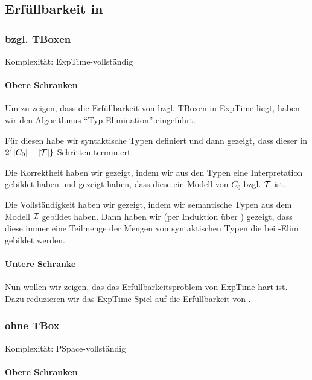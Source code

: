 \subsection{Erfüllbarkeit in \texorpdfstring{\ALC}{ALC}}

\subsubsection{\texorpdfstring{\ALC}{ALC} bzgl. TBoxen}

Komplexität: ExpTime-vollständig

\paragraph{Obere Schranken}

Um zu zeigen, dass die Erfüllbarkeit von \ALC bzgl. TBoxen in ExpTime liegt, haben wir den Algorithmus \enquote{Typ-Elimination} eingeführt.

Für diesen habe wir syntaktische Typen definiert und dann gezeigt, dass dieser in $2^\{|C_0|+|\mathcal{T}|\}$ Schritten terminiert.

Die Korrektheit haben wir gezeigt, indem wir aus den Typen eine Interpretation gebildet haben und gezeigt haben, dass diese ein Modell von $C_0$ bzgl. $\mathcal{T}$ ist.

Die Vollständigkeit haben wir gezeigt, indem wir semantische Typen aus dem Modell $\mathcal{I}$ gebildet haben. Dann haben wir (per Induktion über ) gezeigt, dass diese immer eine Teilmenge der Mengen von syntaktischen Typen die bei \ALC-Elim gebildet werden.

\paragraph{Untere Schranke}

Nun wollen wir zeigen, das das Erfüllbarkeitsproblem von \ALC ExpTime-hart ist. Dazu reduzieren wir das ExpTime Spiel auf die Erfüllbarkeit von \ALC.

\subsubsection{\texorpdfstring{\ALC}{ALC} ohne TBox}

Komplexität: PSpace-vollständig

\paragraph{Obere Schranken}

